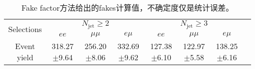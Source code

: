 \begin{table}[!ht]
\scriptsize
\begin{center}
\begin{tabular}{c|c|c|c|c|c|cc}
\hline
\hline
\multirow{2}{*}{Selections} &\multicolumn{3}{c|}{$ N_{\text{jet}} \geq 2$}  &\multicolumn{3}{c}{$ N_{\text{jet}} \geq 3$}  \\
\cline{2-7}
                         &$ee$     &$\mu\mu$     &$e\mu$     &$ee$     &$\mu\mu$     &$e\mu$  \\
\hline
Event yield            &318.27$\pm$9.64  &256.20$\pm$8.06 &332.69$\pm$9.62  &127.38$\pm$6.10 &122.97$\pm$5.58 &138.25$\pm$6.16 \\
\hline
\hline
\end{tabular}
\caption{Fake factor方法给出的fakes计算值，不确定度仅是统计误差。}
\label{tab:summary_jet_fakes}
\end{center}
\end{table}
